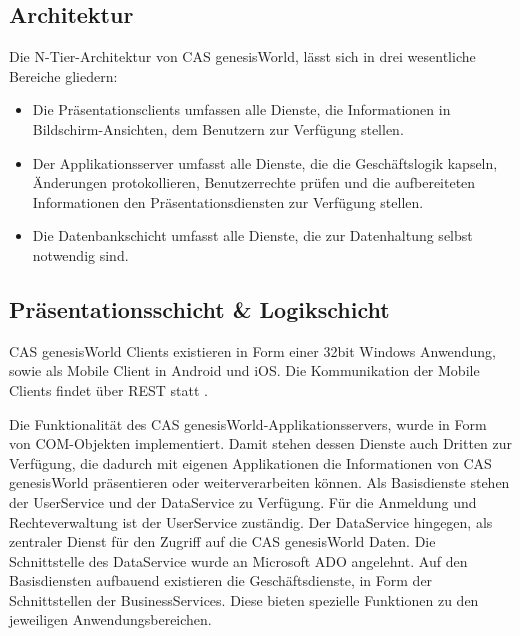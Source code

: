 \subsection{Architektur}

Die N-Tier-Architektur von CAS genesisWorld, lässt sich in drei wesentliche Bereiche gliedern:

\begin{itemize}
	\item Die Präsentationsclients umfassen alle Dienste, die Informationen in Bildschirm-Ansichten, dem Benutzern zur Verfügung stellen.
	\item Der Applikationsserver umfasst alle Dienste, die die Geschäftslogik kapseln, Änderungen protokollieren, Benutzerrechte prüfen und die aufbereiteten Informationen den Präsentationsdiensten zur Verfügung stellen.
	\item Die Datenbankschicht umfasst alle Dienste, die zur Datenhaltung selbst notwendig sind.
\end{itemize}


\subsection{Präsentationsschicht \& Logikschicht}

CAS genesisWorld Clients existieren in Form einer 32bit Windows Anwendung, sowie als Mobile Client in Android und iOS. Die Kommunikation der Mobile Clients findet über REST statt \cite{cas2013a}.

Die Funktionalität des CAS genesisWorld-Applikationsservers, wurde in Form von COM-Objekten implementiert. Damit stehen dessen Dienste auch Dritten zur Verfügung, die dadurch mit eigenen Applikationen die Informationen von CAS genesisWorld präsentieren oder weiterverarbeiten können. Als Basisdienste stehen der UserService und der DataService zu Verfügung. Für die Anmeldung und Rechteverwaltung ist der UserService zuständig. Der DataService hingegen, als zentraler Dienst für den Zugriff auf die CAS genesisWorld Daten. Die Schnittstelle des DataService wurde an Microsoft ADO angelehnt. Auf den Basisdiensten aufbauend existieren die Geschäftsdienste, in Form der Schnittstellen der BusinessServices. Diese bieten spezielle Funktionen zu den jeweiligen Anwendungsbereichen.

